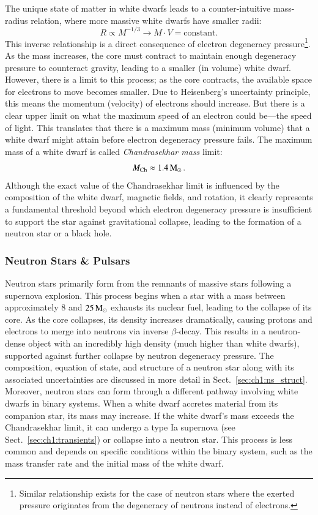 \documentclass[main.tex]{subfiles}
\begin{document}
    The unique state of matter in white dwarfs leads to a counter-intuitive mass-radius relation, where more massive white dwarfs have smaller radii:
    \begin{equation}
        R \propto M^{-1/3} \longrightarrow M\cdot V = \text{constant.}
    \end{equation}
    This inverse relationship is a direct consequence of electron degeneracy pressure\footnote{Similar relationship exists for the case of neutron stars where the exerted pressure originates from the degeneracy of neutrons instead of electrons.}. As the mass increases, the core must contract to maintain enough degeneracy pressure to counteract gravity, leading to a smaller (in volume) white dwarf. However, there is a limit to this process; as the core contracts, the available space for electrons to move becomes smaller. Due to Heisenberg's uncertainty principle, this means the momentum (velocity) of electrons should increase. But there is a clear upper limit on what the maximum speed of an electron could be---the speed of light. This translates that there is a maximum mass (minimum volume) that a white dwarf might attain before electron degeneracy pressure fails. The maximum mass of a white dwarf is called \textit{Chandrasekhar mass} limit:
    \begin{equation}\label{eq:chandra_limit}
        M_\mathrm{Ch} \approx 1.4\mathrm{\,M_\odot}\,.
    \end{equation}
    Although the exact value of the Chandrasekhar limit is influenced by the composition of the white dwarf, magnetic fields, and rotation, it clearly represents a fundamental threshold beyond which electron degeneracy pressure is insufficient to support the star against gravitational collapse, leading to the formation of a neutron star or a black hole.


    \subsubsection{Neutron Stars \& Pulsars}
    Neutron stars primarily form from the remnants of massive stars following a supernova explosion. This process begins when a star with a mass between approximately $8$ and $25\mathrm{\,M_\odot}$ exhausts its nuclear fuel, leading to the collapse of its core. As the core collapses, its density increases dramatically, causing protons and electrons to merge into neutrons via inverse $\beta$-decay. This results in a neutron-dense object with an incredibly high density (much higher than white dwarfs), supported against further collapse by neutron degeneracy pressure. The composition, equation of state, and structure of a neutron star along with its associated uncertainties are discussed in more detail in Sect.~\ref{sec:ch1:ns_struct}.
    Moreover, neutron stars can form through a different pathway involving white dwarfs in binary systems. When a white dwarf accretes material from its companion star, its mass may increase. If the white dwarf's mass exceeds the Chandrasekhar limit, it can undergo a type Ia supernova (see Sect.~\ref{sec:ch1:transients}) or collapse into a neutron star. This process is less common and depends on specific conditions within the binary system, such as the mass transfer rate and the initial mass of the white dwarf.
\end{document}
